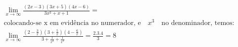 \begin{ex}
\begin{align}
&\lim_{x\rightarrow \infty} \frac{(2x-3)(3x+5)(4x-6)}{3x^3+x+1}=\nonumber\\
&\text{colocando-se x em evidência no numerador, e}\quad x^3\quad\text{no denominador, temos:}\nonumber\\
&\lim_{x\rightarrow \infty} \frac{\left(2-\frac{3}{x}\right)\left(3+\frac{5}{x}\right)\left(4-\frac{6}{x}\right)}{3+\frac{1}{x^2}+\frac{1}{x^3}}=\frac{2.3.4}{3}=8\nonumber
\end{align}
\end{ex}
